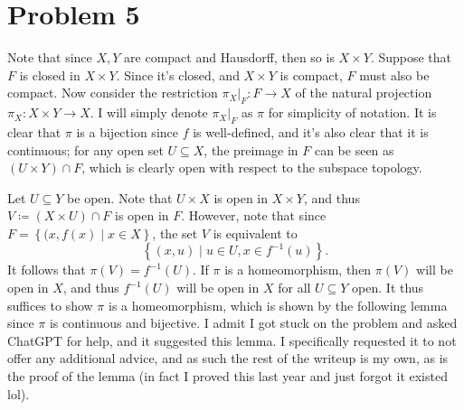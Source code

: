 \documentclass[11pt, letterpaper]{article}
\begin{document}
\section*{Problem 5}
Note that since $X,Y$ are compact and Hausdorff, then so is $X\times Y$. Suppose that $F$ is closed in $X\times Y$. Since it's closed, and $X\times Y$ is compact, $F$ must also be compact. Now consider the restriction $\pi_X|_F : F \to X$ of the natural projection $\pi_X : X\times Y \to X$. I will simply denote $\pi_X|_F$ as $\pi $ for simplicity of notation. It is clear that $\pi $ is a bijection since $f$ is well-defined, and it's also clear that it is continuous; for any open set $U\subseteq X$, the preimage in $F$ can be seen as $\left( U \times Y \right) \cap F$, which is clearly open with respect to the subspace topology.

Let $U\subseteq Y$ be open. Note that $U\times X$ is open in $X\times Y$, and thus $V\coloneqq \left( X \times U \right) \cap F$ is open in $F$. However, note that since $F=\left\{ (x,f(x)\mid x\in X \right\} $, the set $V$ is equivalent to
\[
	\left\{ (x,u)\mid u\in U,x\in f^{-1} (u) \right\} 
.\]
It follows that $\pi (V)=f^{-1} (U)$. If $\pi $ is a homeomorphism, then $\pi (V)$ will be open in $X$, and thus $f^{-1} (U)$ will be open in $X$ for all $U\subseteq Y$ open. It thus suffices to show $\pi $ is a homeomorphism, which is shown by the following lemma since $\pi $ is continuous and bijective. I admit I got stuck on the problem and asked ChatGPT for help, and it suggested this lemma. I specifically requested it to not offer any additional advice, and as such the rest of the writeup is my own, as is the proof of the lemma (in fact I proved this last year and just forgot it existed lol).
\end{document}
